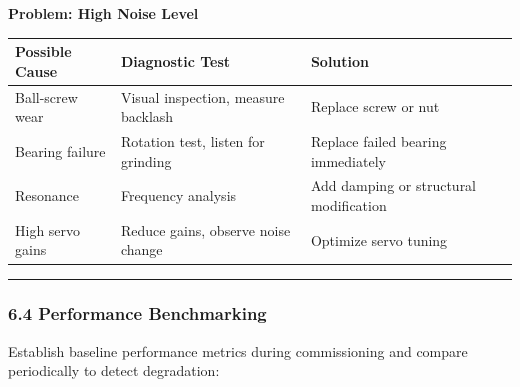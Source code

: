 \documentclass[
]{article}
\begin{document}
\textbf{Problem: High Noise Level}

{\def\LTcaptype{} %
\begin{longtable}[]{@{}
  >{\raggedright\arraybackslash}p{}
  >{\raggedright\arraybackslash}p{}
  >{\raggedright\arraybackslash}p{}@{}}
\toprule\noalign{}
\begin{minipage}[b]{\linewidth}\raggedright
Possible Cause
\end{minipage} & \begin{minipage}[b]{\linewidth}\raggedright
Diagnostic Test
\end{minipage} & \begin{minipage}[b]{\linewidth}\raggedright
Solution
\end{minipage} \\
\midrule\noalign{}
\endhead
\bottomrule\noalign{}
\endlastfoot
Ball-screw wear & Visual inspection, measure backlash & Replace screw or
nut \\
Bearing failure & Rotation test, listen for grinding & Replace failed
bearing immediately \\
Resonance & Frequency analysis & Add damping or structural
modification \\
High servo gains & Reduce gains, observe noise change & Optimize servo
tuning \\
\end{longtable}
}

\begin{center}\rule{0.5\linewidth}{0.5pt}\end{center}

\subsubsection{6.4 Performance
Benchmarking}\label{performance-benchmarking}

Establish baseline performance metrics during commissioning and compare
periodically to detect degradation:
\end{document}
